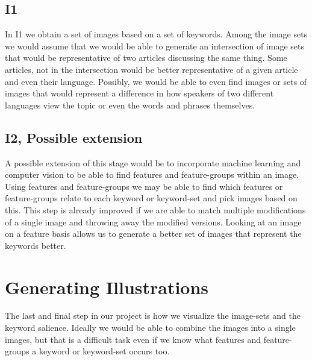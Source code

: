 \documentclass[12pt]{article}
\begin{document}
\subsection{I1}
In I1 we obtain a set of images based on a set of keywords. Among the image sets we would assume that we would 
be able to generate an intersection of image sets that would be representative of two articles discussing the 
same thing. Some articles, not in the intersection would be better representative of a given article and even their language. 
Possibly, we would be able to even find images or sets of images that would represent a difference in how speakers of two different languages
view the topic or even the words and phrases themselves.

\subsection{I2, Possible extension}
A possible extension of this stage would be to incorporate machine learning and computer vision to be able to find features and feature-groups within an image. Using features and feature-groups we may be able to find which features or feature-groups relate to each keyword or keyword-set and pick images based on this. This step is already improved if we are able to match multiple modifications of a single image and throwing away the modified versions. Looking at an image on a feature basis allows
us to generate a better set of images that represent the keywords better.

\section{Generating Illustrations}
The last and final step in our project is how we visualize the image-sets and the keyword salience. Ideally we would be able to combine the images into a single images, but that is a difficult task even if we know what features and feature-groups a keyword or keyword-set occurs too.
\end{document}
